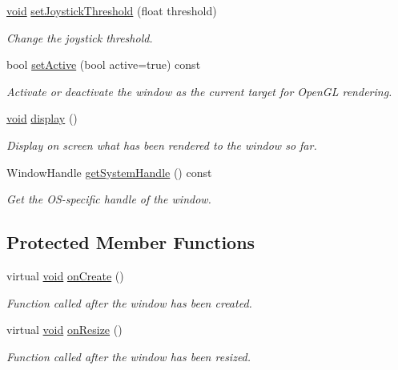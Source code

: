 \begin{DoxyCompactItemize}
\hyperlink{glutf90_8h_ac778d6f63f1aaf8ebda0ce6ac821b56e}{void} \hyperlink{classsf_1_1_window_aa45b8f54e29a6f59f1fc7ee66b2fab68}{set\-Joystick\-Threshold} (float threshold)
\begin{DoxyCompactList}\small\item\em Change the joystick threshold. \end{DoxyCompactList}\item 
bool \hyperlink{classsf_1_1_window_a17ccf8ece0ce0bf2f1e6698bcfa29731}{set\-Active} (bool active=true) const 
\begin{DoxyCompactList}\small\item\em Activate or deactivate the window as the current target for Open\-G\-L rendering. \end{DoxyCompactList}\item 
\hyperlink{glutf90_8h_ac778d6f63f1aaf8ebda0ce6ac821b56e}{void} \hyperlink{classsf_1_1_window_adabf839cb103ac96cfc82f781638772a}{display} ()
\begin{DoxyCompactList}\small\item\em Display on screen what has been rendered to the window so far. \end{DoxyCompactList}\item 
Window\-Handle \hyperlink{classsf_1_1_window_a26368e7162229f8637c34d80ab0f138e}{get\-System\-Handle} () const 
\begin{DoxyCompactList}\small\item\em Get the O\-S-\/specific handle of the window. \end{DoxyCompactList}\end{DoxyCompactItemize}
\subsection*{Protected Member Functions}
\begin{DoxyCompactItemize}
\item 
virtual \hyperlink{glutf90_8h_ac778d6f63f1aaf8ebda0ce6ac821b56e}{void} \hyperlink{classsf_1_1_window_a106633b9be49b27f83d4712689b493eb}{on\-Create} ()
\begin{DoxyCompactList}\small\item\em Function called after the window has been created. \end{DoxyCompactList}\item 
virtual \hyperlink{glutf90_8h_ac778d6f63f1aaf8ebda0ce6ac821b56e}{void} \hyperlink{classsf_1_1_window_a10f567a387da7b49f417f73321fcf64d}{on\-Resize} ()
\begin{DoxyCompactList}\small\item\em Function called after the window has been resized. \end{DoxyCompactList}\end{DoxyCompactItemize}
